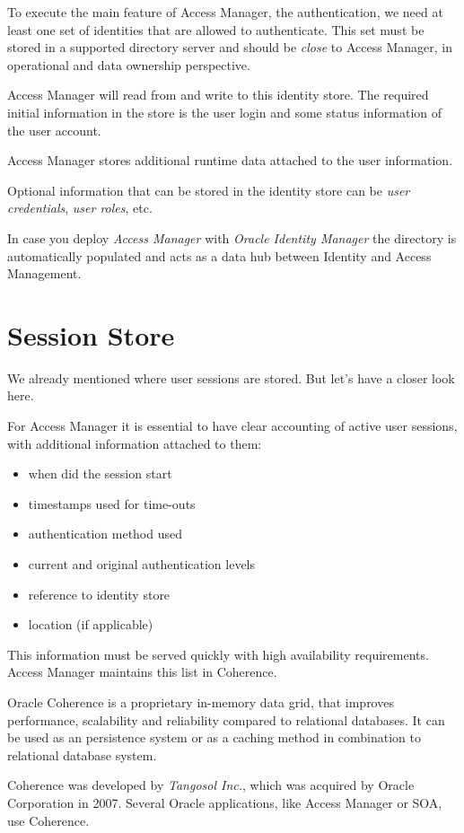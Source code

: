 To execute the main feature of Access Manager, the authentication, we
need at least one set of identities that are allowed to authenticate.
This set must be stored in a supported directory server and should be
\emph{close} to Access Manager, in operational and data ownership
perspective.

Access Manager will read from and write to this identity store. The
required initial information in the store is the user login and some
status information of the user account.

Access Manager stores additional runtime data attached to the user
information.

Optional information that can be stored in the identity store can be
\emph{user credentials}, \emph{user roles}, etc.

In case you deploy \emph{Access Manager} with \emph{Oracle Identity
Manager} the directory is automatically populated and acts as a data hub
between Identity and Access Management.


\section{Session Store}

We already mentioned where user sessions are stored. But let's have a
closer look here.

For Access Manager it is essential to have clear accounting of active
user sessions, with additional information attached to them:

\begin{itemize}
    \item when did the session start
    \item timestamps used for time-outs
    \item authentication method used
    \item current and original authentication levels
    \item reference to identity store
    \item location (if applicable)
\end{itemize}

This information must be served quickly with high availability
requirements. Access Manager maintains this list in Coherence.

\begin{framed}

    Oracle Coherence is a proprietary in-memory data grid, that improves
    performance, scalability and reliability compared to relational
    databases. It can be used as an persistence system or as a caching
    method in combination to relational database system.
    
    Coherence was developed by \emph{Tangosol Inc.}, which was acquired 
    by Oracle Corporation in 2007. Several Oracle applications, like 
    Access Manager or SOA, use Coherence.

\end{framed}

